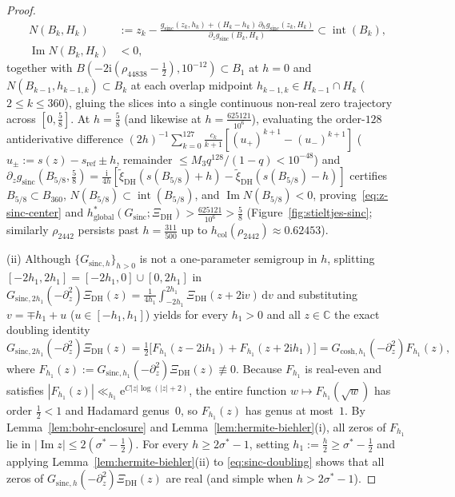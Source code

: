\documentclass[11pt,a4paper,reqno]{amsart}
\theoremstyle{definition}
\theoremstyle{remark}
\numberwithin{equation}{section}
\newcommand{\C}{\mathbb{C}}
\newcommand{\dd}{\mathrm{d}}
\newcommand{\ii}{\mathrm{i}}
\newcommand{\ee}{\mathrm{e}}
\DeclareMathOperator{\Imop}{Im}
\begin{document}
\begin{proof}
\begin{equation*}
  \begin{aligned}
    N(B_k, H_k)
    &:= z_k - \frac{g_{\mathrm{sinc}}(z_k, h_k) + (H_k - h_k)\,\partial_h g_{\mathrm{sinc}}(z_k, H_k)}{\partial_z g_{\mathrm{sinc}}(B_k, H_k)}
    \subset \operatorname{int}(B_k), \\
    \Imop N(B_k, H_k) &< 0,
  \end{aligned}
\end{equation*}
together with $B(-2\ii(\rho_{44838} - \frac{1}{2}), 10^{-12}) \subset B_1$ at $h = 0$ and $N(B_{k-1}, h_{k-1,k}) \subset B_k$ at each overlap midpoint $h_{k-1,k} \in H_{k-1} \cap H_k$ ($2 \le k \le 360$), gluing the slices into a single continuous non-real zero trajectory across $[0, \frac{5}{8}]$. At $h = \frac{5}{8}$ (and likewise at $h = \frac{625121}{10^6}$), evaluating the order-$128$ antiderivative difference $(2h)^{-1}\sum_{k=0}^{127}\frac{c_k}{k+1}[(u_+)^{k+1} - (u_-)^{k+1}]$ ($u_\pm := s(z) - s_{\mathrm{ref}} \pm h$, remainder $\le M_3 q^{128}/(1-q) < 10^{-48}$) and $\partial_z g_{\mathrm{sinc}}(B_{5/8}, \frac{5}{8}) = \frac{\ii}{4h}[\tilde{\xi}_{\mathrm{DH}}(s(B_{5/8})+h) - \tilde{\xi}_{\mathrm{DH}}(s(B_{5/8})-h)]$ certifies $B_{5/8} \subset B_{360}$, $N(B_{5/8}) \subset \operatorname{int}(B_{5/8})$, and $\Imop N(B_{5/8}) < 0$, proving~\eqref{eq:z-sinc-center} and $h_{\mathrm{global}}^*(G_{\mathrm{sinc}}; \Xi_{\mathrm{DH}}) > \frac{625121}{10^6} > \frac{5}{8}$ (Figure~\ref{fig:stieltjes-sinc}; similarly $\rho_{2442}$ persists past $h = \frac{311}{500}$ up to $h_{\mathrm{col}}(\rho_{2442}) \approx 0.62453$).

(ii) Although $\{G_{\mathrm{sinc},h}\}_{h > 0}$ is not a one-parameter semigroup in $h$, splitting $[-2h_1, 2h_1] = [-2h_1, 0] \cup [0, 2h_1]$ in $G_{\mathrm{sinc},2h_1}(-\partial_z^2)\Xi_{\mathrm{DH}}(z) = \frac{1}{4h_1}\int_{-2h_1}^{2h_1}\Xi_{\mathrm{DH}}(z + 2\ii v)\,\dd v$ and substituting $v = \mp h_1 + u$ ($u \in [-h_1, h_1]$) yields for every $h_1 > 0$ and all $z \in \C$ the exact doubling identity
\begin{equation}
  G_{\mathrm{sinc},2h_1}(-\partial_z^2)\Xi_{\mathrm{DH}}(z)
  = \tfrac{1}{2}\bigl[F_{h_1}(z - 2\ii h_1) + F_{h_1}(z + 2\ii h_1)\bigr]
  = G_{\mathrm{cosh},h_1}(-\partial_z^2)F_{h_1}(z),
  \label{eq:sinc-doubling}
\end{equation}
where $F_{h_1}(z) := G_{\mathrm{sinc},h_1}(-\partial_z^2)\Xi_{\mathrm{DH}}(z) \not\equiv 0$. Because $F_{h_1}$ is real-even and satisfies $|F_{h_1}(z)| \ll_{h_1} \ee^{C|z|\log(|z|+2)}$, the entire function $w \mapsto F_{h_1}(\sqrt{w})$ has order $\frac{1}{2} < 1$ and Hadamard genus~$0$, so $F_{h_1}(z)$ has genus at most~$1$. By Lemma~\ref{lem:bohr-enclosure} and Lemma~\ref{lem:hermite-biehler}(i), all zeros of $F_{h_1}$ lie in $|\Imop z| \le 2(\sigma^* - \frac{1}{2})$. For every $h \ge 2\sigma^* - 1$, setting $h_1 := \frac{h}{2} \ge \sigma^* - \frac{1}{2}$ and applying Lemma~\ref{lem:hermite-biehler}(ii) to \eqref{eq:sinc-doubling} shows that all zeros of $G_{\mathrm{sinc},h}(-\partial_z^2)\Xi_{\mathrm{DH}}(z)$ are real (and simple when $h > 2\sigma^* - 1$).
\end{proof}
\end{document}
